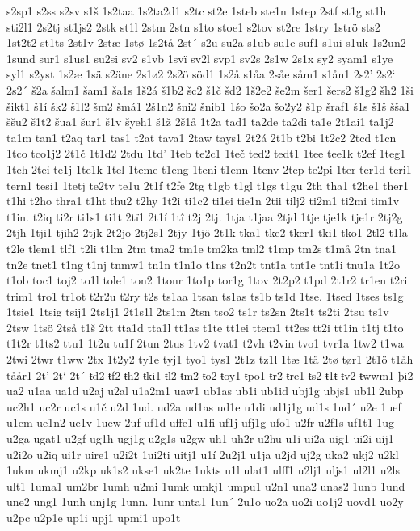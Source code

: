s2sp1
s2ss
s2sv
s1š
1s2taa
1s2ta2d1
s2tc
st2e
1steb
ste1n
1step
2stf
st1g
st1h
sti2l1
2s2tj
st1js2
2stk
st1l
2stm
2stn
s1to
stoe1
s2tov
st2re
1stry
1strö
sts2
1st2t2
st1ts
2st1v
2stæ
1stø
1s2tå
2st´
s2u
su2a
s1ub
su1e
suf1
s1ui
s1uk
1s2un2
1sund
sur1
s1us1
su2si
sv2
s1vb
1svï
sv2l
svp1
sv2s
2s1w
2s1x
sy2
syam1
s1ye
syl1
s2yst
1s2æ
1sä
s2äne
2s1ø2
2s2ö
söd1
1s2å
s1åa
2såe
såm1
s1ån1
2s2'
2s2`
2s2´
š2a
šalm1
šam1
ša1s
1š2á
š1b2
šc2
š1č
šd2
1š2e2
še2m
šer1
šers2
š1g2
šh2
1ši
šikt1
š1í
šk2
š1l2
šm2
šmá1
2š1n2
šni2
šnib1
1šo
šo2a
šo2y2
š1p
šraf1
š1s
š1š
šša1
ššu2
š1t2
šua1
šur1
š1v
šyeh1
š1ž
2š1å
1t2a
tad1
ta2de
ta2di
ta1e
2t1ai1
ta1j2
ta1m
tan1
t2aq
tar1
tas1
t2at
tava1
2taw
tays1
2t2á
2t1b
t2bi
1t2c2
2tcd
t1cn
1tco
tco1j2
2t1č
1t1d2
2tdu
1td'
1teb
te2c1
1teč
ted2
tedt1
1tee
tee1k
t2ef
1teg1
1teh
2tei
te1j
1te1k
1tel
1teme
t1eng
1teni
t1enn
1tenv
2tep
te2pi
1ter
ter1d
teri1
tern1
tesi1
1tetj
te2tv
te1u
2t1f
t2fe
2tg
t1gb
t1gl
t1gs
t1gu
2th
tha1
t2he1
ther1
t1hi
t2ho
thra1
t1ht
thu2
t2hy
1t2i
ti1c2
ti1ei
tie1n
2tii
tilj2
ti2m1
ti2mi
tim1v
t1in.
t2iq
ti2r
ti1s1
ti1t
2tï1
2t1í
1tî
t2j
2tj.
1tja
t1jaa
2tjd
1tje
tje1k
tje1r
2tj2g
2tjh
1tji1
tjih2
2tjk
2t2jo
2tj2s1
2tjy
1tjö
2t1k
tka1
tke2
tker1
tki1
tko1
2tl2
t1la
t2le
tlem1
tlf1
t2li
t1lm
2tm
tma2
tm1e
tm2ka
tml2
t1mp
tm2s
t1må
2tn
tna1
tn2e
tnet1
t1ng
t1nj
tnmw1
tn1n
t1n1o
t1ns
t2n2t
tnt1a
tnt1e
tnt1i
tnu1a
1t2o
t1ob
toc1
toj2
to1l
tole1
ton2
1tonr
1to1p
tor1g
1tov
2t2p2
t1pd
2t1r2
tr1en
t2ri
trim1
tro1
tr1ot
t2r2u
t2ry
t2s
ts1aa
1tsan
ts1as
ts1b
ts1d
1tse.
1tsed
1tses
ts1g
1tsie1
1tsig
tsij1
2ts1j1
2t1s1l
2ts1m
2tsn
tso2
ts1r
ts2sn
2ts1t
ts2ti
2tsu
ts1v
2tsw
1tsö
2tså
t1š
2tt
tta1d
tta1l
tt1as
t1te
tt1ei
ttem1
tt2es
tt2i
tt1in
t1tj
t1to
t1t2r
t1ts2
ttu1
1t2u
tu1f
2tun
2tus
1tv2
tvat1
t2vh
t2vin
tvo1
tvr1a
1tw2
t1wa
2twi
2twr
t1ww
2tx
1t2y2
ty1e
tyj1
tyo1
tys1
2t1z
tz1l
1tæ
1tä
2tø
tør1
2t1ö
t1åh
tåår1
2t'
2t`
2t´
ŧd2
ŧf2
ŧh2
ŧki1
ŧl2
ŧm2
ŧo2
ŧoy1
ŧpo1
ŧr2
ŧre1
ŧs2
ŧ1ŧ
ŧv2
ŧwwm1
þi2
ua2
u1aa
ua1d
u2aj
u2al
u1a2m1
uaw1
ub1as
ub1i
ub1id
ubj1g
ubjs1
ub1l
2ubp
uc2h1
uc2r
uc1s
u1č
u2d
1ud.
ud2a
ud1as
ud1e
u1di
ud1j1g
ud1s
1ud´
u2e
1uef
u1em
ue1n2
ue1v
1uew
2uf
uf1d
uffe1
u1fi
uf1j
ufj1g
ufo1
u2fr
u2f1s
uf1t1
1ug
u2ga
ugat1
u2gf
ug1h
ugj1g
u2g1s
u2gw
uh1
uh2r
u2hu
u1i
ui2a
uig1
ui2i
uij1
u2i2o
u2iq
ui1r
uire1
u2i2t
1ui2ti
uitj1
u1í
2u2j1
u1ja
u2jd
uj2g
uka2
ukj2
u2kl
1ukm
ukmj1
u2kp
uk1s2
ukse1
uk2te
1ukts
u1l
ulat1
ulff1
u2lj1
uljs1
ul2l1
u2ls
ult1
1uma1
um2br
1umh
u2mi
1umk
umkj1
umpu1
u2n1
una2
unas2
1unb
1und
une2
ung1
1unh
unj1g
1unn.
1unr
unta1
1un´
2u1o
uo2a
uo2i
uo1j2
uovd1
uo2y
u2pc
u2p1e
up1i
upj1
upmi1
upo1t
